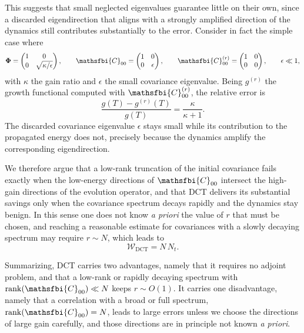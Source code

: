 This suggests that small neglected eigenvalues guarantee little on their own, since a discarded
eigendirection that aligns with a strongly amplified direction of the dynamics still contributes
substantially to the error. Consider in fact the simple case where
\begin{equation}
  \boldsymbol{\Phi}
  =
  \begin{pmatrix}
    1 & 0 \\
    0 & \sqrt{\kappa/\epsilon}
  \end{pmatrix},
  \qquad
  \mathsfbi{C}_{00}
  =
  \begin{pmatrix}
    1 & 0 \\
    0 & \epsilon
  \end{pmatrix},
  \qquad
  \mathsfbi{C}_{00}^{(r)}
  =
  \begin{pmatrix}
    1 & 0 \\
    0 & 0
  \end{pmatrix},
  \qquad
  \epsilon \ll 1 ,
  \label{eq:low_rank_failure_example}
\end{equation}
with \(\kappa\) the gain ratio and \(\epsilon\) the small covariance eigenvalue. Being
\(g^{(r)}\) the growth functional computed with \(\mathsfbi{C}_{00}^{(r)}\), the relative error is
\begin{equation}
  \frac{
    g(T)-g^{(r)}(T)
  }{
    g(T)
  }
  =
  \frac{\kappa}{\kappa+1}.
  \label{eq:low_rank_failure_relative_error}
\end{equation}
The discarded covariance eigenvalue \(\epsilon\) stays small while its contribution to the
propagated energy does not, precisely because the dynamics amplify the corresponding
eigendirection.

We therefore argue that a low-rank truncation of the initial covariance fails exactly when the
low-energy directions of \(\mathsfbi{C}_{00}\) intersect the high-gain directions of the evolution
operator, and that DCT delivers its substantial savings only when the covariance spectrum decays
rapidly and the dynamics stay benign. In this sense one does not know \emph{a priori} the value of
\(r\) that must be chosen, and reaching a reasonable estimate for covariances with a slowly
decaying spectrum may require \(r\sim N\), which leads to
\begin{equation}
  \mathcal{W}_{\mathrm{DCT}}=N\,N_t.
  \label{eq:deterministic_full_rank_cost}
\end{equation}

Summarizing, DCT carries two advantages, namely that it requires no adjoint problem, and that a
low-rank or rapidly decaying spectrum with \(\mathrm{rank}(\mathsfbi{C}_{00})\ll N\) keeps
\(r\sim O(1)\). It carries one disadvantage, namely that a correlation with a broad or full
spectrum, \(\mathrm{rank}(\mathsfbi{C}_{00})=N\), leads to large errors unless we choose the
directions of large gain carefully, and those directions are in principle not known \emph{a
priori}.
